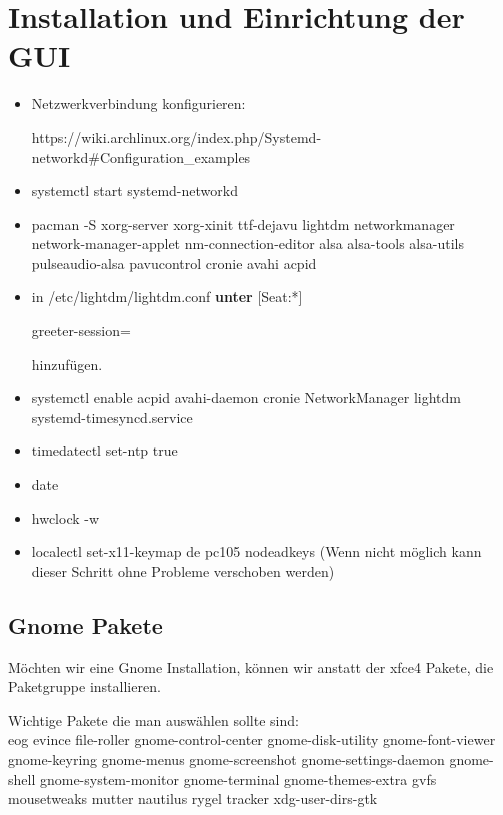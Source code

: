 \documentclass[11pt,a4paper]{article}
\begin{document}
\section{Installation und Einrichtung der GUI}
\begin{itemize}
\item Netzwerkverbindung konfigurieren:

https://wiki.archlinux.org/index.php/Systemd-networkd\#Configuration\_examples
\item systemctl start systemd-networkd
\item pacman -S xorg-server xorg-xinit ttf-dejavu \textcolor{red}{} lightdm \textcolor{red}{}  networkmanager network-manager-applet nm-connection-editor alsa alsa-tools alsa-utils pulseaudio-alsa pavucontrol cronie avahi acpid
\item in \glqq{}/etc/lightdm/lightdm.conf\grqq{} \textbf{unter} [Seat:*] 

greeter-session=\textcolor{red}{} 

hinzufügen.
\item systemctl enable acpid avahi-daemon cronie NetworkManager lightdm systemd-timesyncd.service
\item timedatectl set-ntp true 
\item date
\item hwclock -w
\item localectl set-x11-keymap de pc105 nodeadkeys (Wenn nicht möglich kann dieser Schritt ohne Probleme verschoben werden)
\end{itemize}
\subsection{Gnome Pakete}
Möchten wir eine Gnome Installation, können wir anstatt der xfce4 Pakete, die Paketgruppe \textcolor{red}{} installieren.

Wichtige Pakete die man auswählen sollte sind:\\

eog evince file-roller gnome-control-center gnome-disk-utility gnome-font-viewer gnome-keyring gnome-menus gnome-screenshot gnome-settings-daemon gnome-shell gnome-system-monitor gnome-terminal  gnome-themes-extra gvfs mousetweaks mutter nautilus rygel tracker xdg-user-dirs-gtk
\end{document}
